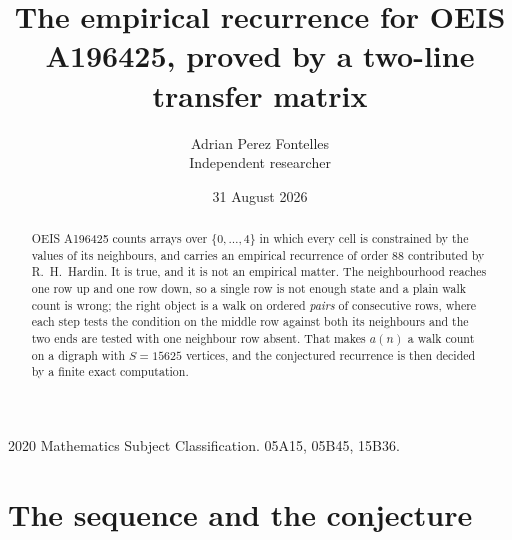 \documentclass[11pt,a4paper]{article}
\title{The empirical recurrence for OEIS A196425, proved by a two-line transfer matrix}
\author{Adrian Perez Fontelles\\ \small Independent researcher}
\date{31 August 2026}
\theoremstyle{plain}
\theoremstyle{definition}
\begin{document}
\maketitle

\begin{abstract}
OEIS A196425 counts arrays over $\{0,\dots,4\}$ in which every cell is constrained by the
values of its neighbours, and carries an empirical recurrence of order $88$ contributed
by R.~H.~Hardin. It is true, and it is not an empirical matter. The neighbourhood reaches one
row up and one row down, so a single row is not enough state and a plain walk count
is wrong; the right object is a walk on ordered \emph{pairs} of consecutive rows, where
each step tests the condition on the middle row against both its neighbours and the two
ends are tested with one neighbour row absent. That makes $a(n)$ a walk count on a digraph
with $S=15625$ vertices, and the conjectured recurrence is then decided by a finite exact
computation.
\end{abstract}

\noindent\small 2020 Mathematics Subject Classification. 05A15, 05B45, 15B36.\normalsize

\section{The sequence and the conjecture}
\end{document}
